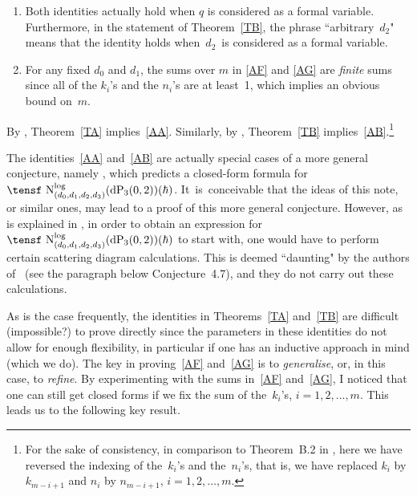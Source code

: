 \documentclass[pdftex]{sigma}
\begin{document}
\begin{Remarks}\quad
\begin{enumerate}\itemsep=0pt
\item[(1)] Both identities actually hold when $q$ is considered as a formal variable.
Furthermore, in the statement of Theorem~\ref{TB}, the phrase ``arbitrary~$d_2$"
means that the identity holds when~$d_2$~is considered as a formal variable.

\item[(2)] For any fixed $d_0$ and $d_1$,
the sums over $m$ in \eqref{AF} and \eqref{AG} are {\it finite} sums since
all of the $k_i$'s and the $n_i$'s are at least~1, which implies
an obvious bound on~$m$.
\end{enumerate}
\end{Remarks}

By \cite[Theorem~B.1]{BoBGAA}, Theorem~\ref{TA} implies~\eqref{AA}.
Similarly, by \cite[Theorem~B.2]{BoBGAA}, Theorem~\ref{TB}
implies~\eqref{AB}.\footnote{For the sake of consistency, in
comparison to Theorem~B.2 in \cite{BoBGAA},
here we have reversed the indexing of the~$k_i$'s and the~$n_i$'s,
that is, we have replaced $k_i$ by $k_{m-i+1}$ and $n_i$ by
$n_{m-i+1}$, $i=1,2,\dots,m$.}

The identities~\eqref{AA} and~\eqref{AB} are actually special cases of a more
general conjecture, namely \mbox{\cite[Conjecture~4.7]{BoBGAA}}, which
predicts a closed-form formula for
$\text{\tensf
N}_{(d_0,d_1,d_2,d_3)}^{\log}(\text{dP}_3(0,2))(\hbar)$.
It~is~con\-ceiv\-able that the ideas of this note, or similar ones,
may lead to a proof of this more general conjecture. However, as is
explained in \cite[Section~4.2]{BoBGAA}, in order to obtain an
expression for~$\text{\tensf
N}_{(d_0,d_1,d_2,d_3)}^{\log}(\text{dP}_3(0,2))(\hbar)$
to start with,
one would have to perform certain scattering diagram calculations.
This is deemed ``daunting" by the authors of~\cite{BoBGAA} (see the
paragraph below Conjecture~4.7), and they do not carry out these
calculations.

As is the case frequently, the identities in Theorems~\ref{TA} and~\ref{TB}
are difficult (impossible?) to prove directly since the parameters
in these identities do not allow for enough flexibility, in particular
if one has an inductive approach in mind (which we do).
The key in proving~\eqref{AF}
and~\eqref{AG} is to {\it generalise}, or, in this case, to {\it refine}.
By experimenting with the sums in~\eqref{AF} and~\eqref{AG}, I noticed that
one can still get closed forms if we fix the sum of the~$k_i$'s,
$i=1,2,\dots,m$. This leads us to the following key result.
\end{document}
